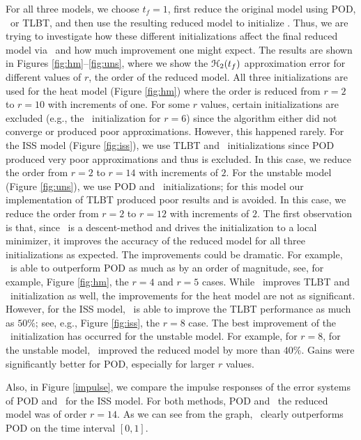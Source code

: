 \documentclass[twocolumn]{autart}
\begin{document}
For all three models, we choose $t_f = 1$, first reduce the original model using POD, \goyal \  or TLBT, and then use the resulting reduced model  to initialize \FH. Thus, we are trying to investigate how these different initializations affect the final reduced model via  \FH \ and how much improvement one might expect.
The results are shown in Figures \ref{fig:hm}--\ref{fig:uns},  where we show the $\EuScript{H}_2(t_f)$ approximation error for different values of $r$, the order of the reduced model.
  All three initializations are used for the heat model (Figure \ref{fig:hm}) where the order is reduced from $r=2$ to $r=10$ with increments of one. For some $r$ values, certain initializations are excluded (e.g., the \goyal \ initialization for $r=6$) since the algorithm either did not converge or produced  poor approximations. However, this happened rarely. For the ISS model (Figure \ref{fig:iss}), we use  TLBT and \goyal \ initializations since  POD produced very poor approximations and thus is excluded. In this case, we reduce the order from $r=2$ to $r=14$ with increments of $2$. For the unstable model (Figure \ref{fig:uns}), we use POD and \goyal \ initializations; for this model our implementation of TLBT produced  poor results and is avoided. In this case,  we reduce the order from $r=2$ to $r=12$ with increments of $2$.  
 The first observation is that,  since  \FH \ is a descent-method and drives the initialization to a local minimizer,  it improves the accuracy of  the reduced model for all three initializations as expected. The improvements could be dramatic. For example, 
 \FH \ is able to outperform POD as much as by an order of magnitude, see, for example,
 Figure \ref{fig:hm}, the  $r=4$ and $r=5$ cases. 
 While \FH \ improves TLBT and \goyal\ initialization as well, the improvements for the heat model are not as significant. However, for the ISS model,
\FH \ is able to improve the TLBT performance as much as $50\%$; see, e.g., Figure \ref{fig:iss}, the $r=8$ case. 
The best improvement of the \goyal \ initialization has occurred for the unstable model. For example, for $r=8$, for the unstable model, \FH\ improved the reduced model by more than $40 \%$. Gains were significantly better for POD, especially for larger $r$ values. 
{\color{red} Also, in Figure \ref{impulse}, we compare the impulse responses of the error systems of POD and \FH \ for the ISS model. For both methods, POD and \FH\  the reduced model was of order $r=14$. As we can see from the graph, \FH \ clearly outperforms POD on the time interval $[0, 1]$.

}
\end{document}
